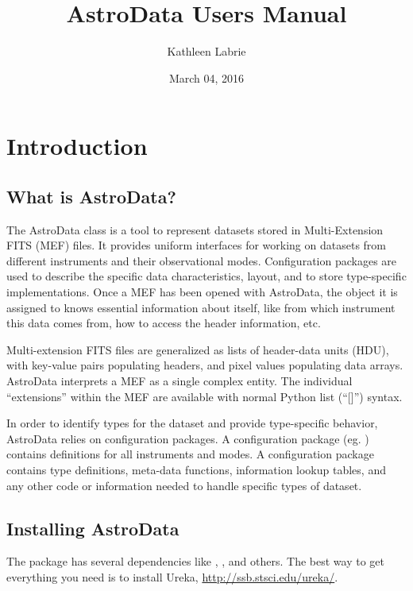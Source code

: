 \documentclass[letterpaper,10pt,english]{sphinxmanual}
\title{AstroData Users Manual}
\date{March 04, 2016}
\author{Kathleen Labrie}
\begin{document}
\maketitle
\tableofcontents
{}\label{index-latex::doc}



\chapter{Introduction}
\label{intro:introduction}\label{intro:intro}\label{intro::doc}\label{intro:astrodata-user-s-manual}

\section{What is AstroData?}
\label{intro:what-is-astrodata}
The AstroData class is a tool to represent datasets stored in
Multi-Extension FITS (MEF) files. It provides uniform interfaces for
working on datasets from different instruments and their observational modes.
Configuration packages are used to describe the specific data characteristics,
layout, and to store type-specific implementations.  Once a MEF has been
opened with AstroData, the object it is assigned to knows essential information
about itself, like from which instrument this data comes from, how to access
the header information, etc.

Multi-extension FITS files are generalized as lists of header-data units
(HDU), with key-value pairs populating headers, and pixel values populating
data arrays. AstroData interprets a MEF as a single complex entity.  The
individual ``extensions'' within the MEF are available with normal Python list
(``{[}{]}'') syntax.

In order to identify types for the dataset and provide type-specific behavior,
AstroData relies on configuration packages.  A configuration package (eg.
) contains definitions for all instruments and modes. A
configuration package contains type definitions, meta-data functions,
information lookup tables, and any other code or information needed to handle
specific types of dataset.


\section{Installing AstroData}
\label{intro:installing-astrodata}\label{intro:install}
The  package has several dependencies like , , and others.
The best way to get everything you need is to install Ureka, \href{http://ssb.stsci.edu/ureka/}{http://ssb.stsci.edu/ureka/}.
\end{document}

